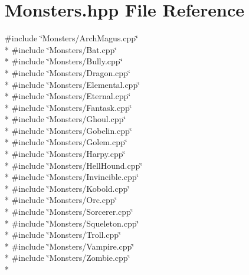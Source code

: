 \section{Monsters.\-hpp File Reference}
\label{_monsters_8hpp}
{\ttfamily \#include \char`\"{}Monsters/\-Arch\-Magus.\-cpp\char`\"{}}\\*
{\ttfamily \#include \char`\"{}Monsters/\-Bat.\-cpp\char`\"{}}\\*
{\ttfamily \#include \char`\"{}Monsters/\-Bully.\-cpp\char`\"{}}\\*
{\ttfamily \#include \char`\"{}Monsters/\-Dragon.\-cpp\char`\"{}}\\*
{\ttfamily \#include \char`\"{}Monsters/\-Elemental.\-cpp\char`\"{}}\\*
{\ttfamily \#include \char`\"{}Monsters/\-Eternal.\-cpp\char`\"{}}\\*
{\ttfamily \#include \char`\"{}Monsters/\-Fantask.\-cpp\char`\"{}}\\*
{\ttfamily \#include \char`\"{}Monsters/\-Ghoul.\-cpp\char`\"{}}\\*
{\ttfamily \#include \char`\"{}Monsters/\-Gobelin.\-cpp\char`\"{}}\\*
{\ttfamily \#include \char`\"{}Monsters/\-Golem.\-cpp\char`\"{}}\\*
{\ttfamily \#include \char`\"{}Monsters/\-Harpy.\-cpp\char`\"{}}\\*
{\ttfamily \#include \char`\"{}Monsters/\-Hell\-Hound.\-cpp\char`\"{}}\\*
{\ttfamily \#include \char`\"{}Monsters/\-Invincible.\-cpp\char`\"{}}\\*
{\ttfamily \#include \char`\"{}Monsters/\-Kobold.\-cpp\char`\"{}}\\*
{\ttfamily \#include \char`\"{}Monsters/\-Orc.\-cpp\char`\"{}}\\*
{\ttfamily \#include \char`\"{}Monsters/\-Sorcerer.\-cpp\char`\"{}}\\*
{\ttfamily \#include \char`\"{}Monsters/\-Squeleton.\-cpp\char`\"{}}\\*
{\ttfamily \#include \char`\"{}Monsters/\-Troll.\-cpp\char`\"{}}\\*
{\ttfamily \#include \char`\"{}Monsters/\-Vampire.\-cpp\char`\"{}}\\*
{\ttfamily \#include \char`\"{}Monsters/\-Zombie.\-cpp\char`\"{}}\\*
